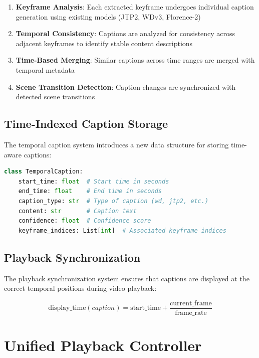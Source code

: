 \documentclass[10pt]{article}
\begin{document}
\begin{enumerate}
    \item \textbf{Keyframe Analysis}: Each extracted keyframe undergoes individual caption generation using existing models (JTP2, WDv3, Florence-2)
    \item \textbf{Temporal Consistency}: Captions are analyzed for consistency across adjacent keyframes to identify stable content descriptions
    \item \textbf{Time-Based Merging}: Similar captions across time ranges are merged with temporal metadata
    \item \textbf{Scene Transition Detection}: Caption changes are synchronized with detected scene transitions
\end{enumerate}

\subsection{Time-Indexed Caption Storage}

The temporal caption system introduces a new data structure for storing time-aware captions:

\begin{lstlisting}[language=Python]
class TemporalCaption:
    start_time: float  # Start time in seconds
    end_time: float    # End time in seconds
    caption_type: str  # Type of caption (wd, jtp2, etc.)
    content: str       # Caption text
    confidence: float  # Confidence score
    keyframe_indices: List[int]  # Associated keyframe indices
\end{lstlisting}

\subsection{Playback Synchronization}

The playback synchronization system ensures that captions are displayed at the correct temporal positions during video playback:

\begin{equation}
    \text{display\_time}(caption) = \text{start\_time} + \frac{\text{current\_frame}}{\text{frame\_rate}}
\end{equation}

\section{Unified Playback Controller}
\end{document}
